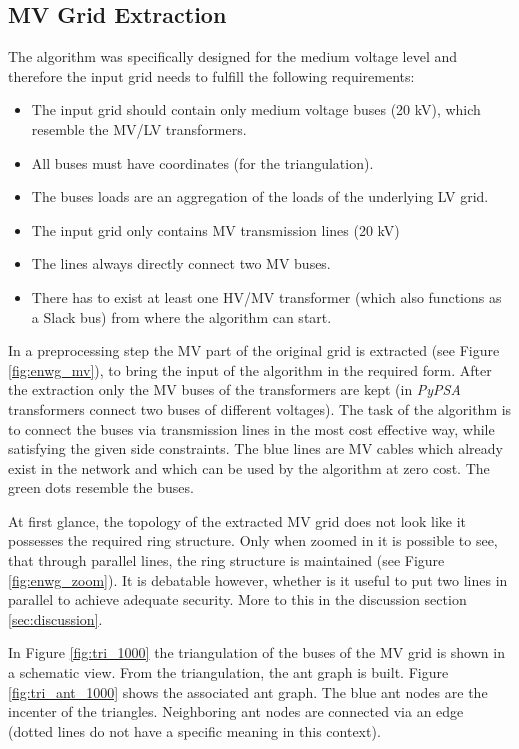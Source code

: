 \subsection{MV Grid Extraction}\label{sec:extraction}
The algorithm was specifically designed for the medium voltage level and therefore the input grid needs to fulfill the following requirements:
\begin{itemize}
	\setlength\itemsep{-1em}
	\item The input grid should contain only medium voltage buses (20 kV), which resemble the MV/LV transformers.
	\item All buses must have coordinates (for the triangulation).
	\item The buses loads are an aggregation of the loads of the underlying LV grid.
	\item The input grid only contains MV transmission lines (20 kV)
	\item The lines always directly connect two MV buses. 
	\item There has to exist at least one HV/MV transformer (which also functions as a Slack bus) from where the algorithm can start.
\end{itemize}



In a preprocessing step the MV part of the original grid is extracted (see Figure \ref{fig:enwg_mv}), to bring the input of the algorithm in the required form. After the extraction only the MV buses of the transformers are kept (in \textit{PyPSA} transformers connect two buses of different voltages). The task of the algorithm is to connect the buses via transmission lines in the most cost effective way, while satisfying the given side constraints. The blue lines are MV cables which already exist in the network and which can be used by the algorithm at zero cost. The green dots resemble the buses.




At first glance, the topology of the extracted MV grid does not look like it possesses the required ring structure. Only when zoomed in it is possible to see, that through parallel lines, the ring structure is maintained (see Figure \ref{fig:enwg_zoom}). It is debatable however, whether is it useful to put two lines in parallel to achieve adequate security. More to this in the discussion section \ref{sec:discussion}.
%


In Figure \ref{fig:tri_1000} the triangulation of the buses of the MV grid is shown in a schematic view. From the triangulation, the ant graph is built. Figure \ref{fig:tri_ant_1000} shows the associated ant graph. The blue ant nodes are the incenter of the triangles. Neighboring ant nodes are connected via an edge (dotted lines do not have a specific meaning in this context).

